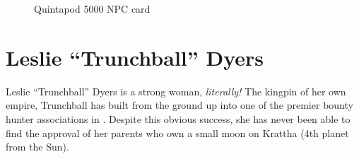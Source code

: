 



\begin{figure*}
  \centering
  \GCCardPrint
  \ResetCharacterKey
  \caption{Quintapod 5000 NPC card}
  \label{fig:quintapod-npc-card}
\end{figure*}

\section{Leslie ``Trunchball'' Dyers}
\label{sec:lesl-trunchb-dyers}

Leslie ``Trunchball'' Dyers is a strong woman, \emph{literally!} The kingpin of
her own empire, Trunchball has built \thecompany from the ground up into one of
the premier bounty hunter associations in . Despite this obvious
success, she has never been able to find the approval of her parents who own a
small moon on Krattha (4th planet from the Sun).

